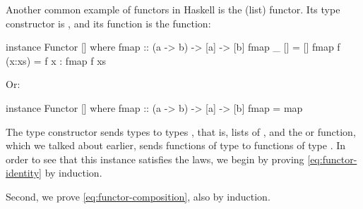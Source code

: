 \begin{example}
  \label{ex:functor-list-haskell}


  Another common example of functors in Haskell is the
  \texthaskell{[]} (list) functor. Its type constructor is
  \texthaskell{[]}, and its  function is the
   function:
  \begin{codehaskell}
instance Functor [] where
  fmap :: (a -> b) -> [a] -> [b]
  fmap _ []     = []
  fmap f (x:xs) = f x : fmap f xs
  \end{codehaskell}
  Or:
  \begin{codehaskell}
instance Functor [] where
  fmap :: (a -> b) -> [a] -> [b]
  fmap = map
  \end{codehaskell}
  The \texthaskell{[]} type constructor sends types  to
  types \texthaskell{[a]}, that is, lists of , and the
   or  function, which we talked
  about earlier, sends functions of type  to
  functions of type \texthaskell{[a] -> [b]}. In order to see that
  this instance satisfies the laws, we begin by proving
  \eqref{eq:functor-identity} by induction.

  \vspace{1em}
  \case{\texthaskell{[]}}
  \begin{steps}
    \steph{[]}
  \end{steps}
  \begin{steps}
      \eqbyihh{}
  \end{steps}
  Second, we prove \eqref{eq:functor-composition}, also by induction.

  \vspace{1em}
  \case{\texthaskell{[]}}
  \begin{steps}
    \steph{[]}
  \end{steps}
  \begin{steps}
      \eqbyihh{}
  \end{steps}

\end{example}

